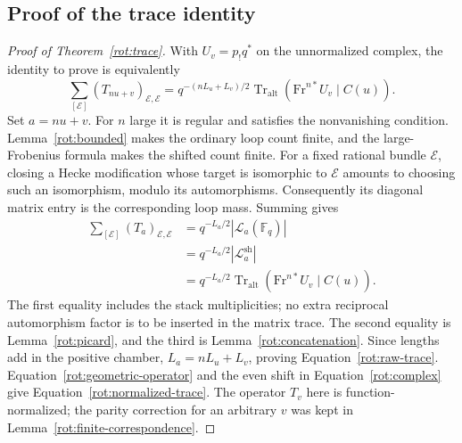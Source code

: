 \subsection{Proof of the trace identity}

\begin{proof}[Proof of Theorem~\ref{rot:trace}]
With $U_v=p_!q^*$ on the unnormalized complex, the identity to prove is
equivalently
\begin{equation}\label{rot:raw-trace}
 \sum_{[\mathcal E]}(T_{nu+v})_{\mathcal E,\mathcal E}
  =q^{-(nL_u+L_v)/2}
       \operatorname{Tr}_{\mathrm{alt}}
           (\mathrm{Fr}^{n*}U_v\mid C(u)).
\end{equation}
Set $a=nu+v$.  For $n$ large it is regular and satisfies the
nonvanishing condition.  Lemma~\ref{rot:bounded} makes the ordinary
loop count finite, and the large-Frobenius formula makes the shifted
count finite.  For a fixed rational bundle $\mathcal E$, closing a
Hecke modification whose target is isomorphic to $\mathcal E$ amounts
to choosing such an isomorphism, modulo its automorphisms.  Consequently
its diagonal matrix entry is the corresponding loop mass.  Summing
gives
\[
 \begin{aligned}
 \sum_{[\mathcal E]}(T_a)_{\mathcal E,\mathcal E}
       &=q^{-L_a/2}|\mathcal L_a(\mathbb F_q)|\\
       &=q^{-L_a/2}|\mathcal L_a^{\mathrm{sh}}|\\
       &=q^{-L_a/2}\operatorname{Tr}_{\mathrm{alt}}
          (\mathrm{Fr}^{n*}U_v\mid C(u)).
 \end{aligned}
\]
The first equality includes the stack multiplicities; no extra reciprocal
automorphism factor is to be inserted in the matrix trace.
The second equality is Lemma~\ref{rot:picard}, and the third is
Lemma~\ref{rot:concatenation}.  Since lengths add in the positive chamber,
$L_a=nL_u+L_v$, proving Equation~\eqref{rot:raw-trace}.
Equation~\eqref{rot:geometric-operator} and the even shift in
Equation~\eqref{rot:complex} give
Equation~\eqref{rot:normalized-trace}.  The operator $T_v$ here is
function-normalized; the parity correction for an arbitrary $v$ was
kept in Lemma~\ref{rot:finite-correspondence}.
\end{proof}
